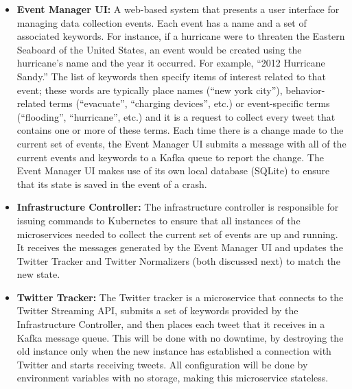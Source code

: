 \begin{itemize}
	\item \textbf{Event Manager UI:} A web-based system that presents a user interface for managing data collection events. Each event has a name and a set of associated keywords. For instance, if a hurricane were to threaten the Eastern Seaboard of the United States, an event would be created using the hurricane’s name and the year it occurred. For example, “2012 Hurricane Sandy.” The list of keywords then specify items of interest related to that event; these words are typically place names (“new york city”), behavior-related terms (“evacuate”, “charging devices”, etc.) or event-specific terms (“flooding”, “hurricane”, etc.) and it is a request to collect every tweet that contains one or more of these terms. Each time there is a change made to the current set of events, the Event Manager UI submits a message with all of the current events and keywords to a Kafka queue to report the change. The Event Manager UI makes use of its own local database (SQLite) to ensure that its state is saved in the event of a crash.
	\item \textbf{Infrastructure Controller:} The infrastructure controller is responsible for issuing commands to Kubernetes to ensure that all instances of the microservices needed to collect the current set of events are up and running. It receives the messages generated by the Event Manager UI and updates the Twitter Tracker and Twitter Normalizers (both discussed next) to match the new state.
	\item \textbf{Twitter Tracker:} The Twitter tracker is a microservice that connects to the Twitter Streaming API, submits a set of keywords provided by the Infrastructure Controller, and then places each tweet that it receives in a Kafka message queue. This will be done with no downtime, by destroying the old instance only when the new instance has established a connection with Twitter and starts receiving tweets. All configuration will be done by environment variables with no storage, making this microservice stateless.

\end{itemize}
